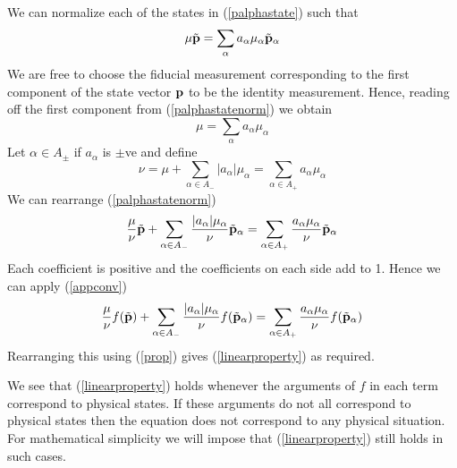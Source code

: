 \documentclass[10pt,twocolumn]{article}
\begin{document}
We can normalize each of the states in (\ref{palphastate}) such that
\begin{equation}\label{palphastatenorm}
\mu\tilde{\bf p}=\sum_\alpha a_\alpha\mu_\alpha \tilde{\bf p}_\alpha
\end{equation}
We are free to choose the fiducial measurement corresponding to the first
component of the state vector ${\bf p}$ to be the identity measurement.
Hence, reading off the first component from (\ref{palphastatenorm}) we
obtain
\begin{equation}
\mu= \sum_\alpha a_\alpha\mu_\alpha
\end{equation}
Let $\alpha\in A_{\pm}$ if $a_\alpha$ is $\pm$ve and define
\begin{equation}
\nu=\mu+\sum_{\alpha\in A_-} |a_\alpha|\mu_\alpha
=\sum_{\alpha\in A_+} a_\alpha \mu_\alpha
\end{equation}
We can rearrange (\ref{palphastatenorm})
\begin{equation}
{\mu\over\nu} \tilde{\bf p} + \sum_{\alpha\in A_-} {|a_\alpha
|\mu_\alpha \over \nu}\tilde{\bf p}_\alpha
=\sum_{\alpha\in A_+} {a_\alpha \mu_\alpha \over \nu}\tilde{\bf p}_\alpha
\end{equation}
Each coefficient is positive and the coefficients on each side add to
1. Hence we can apply (\ref{appconv})
\begin{equation}
{\mu\over\nu} f(\tilde{\bf p}) + \sum_{\alpha\in A_-} {|a_\alpha
|\mu_\alpha \over \nu}f(\tilde{\bf p}_\alpha)
=\sum_{\alpha\in A_+} {a_\alpha \mu_\alpha \over \nu}f(\tilde{\bf
p}_\alpha)
\end{equation}
Rearranging this using (\ref{prop}) gives (\ref{linearproperty}) as required.

We see that (\ref{linearproperty}) holds whenever the
arguments of $f$ in each term correspond to physical states.  If these
arguments do not all correspond to physical states then the equation does
not correspond to any physical situation. For mathematical simplicity we
will impose that (\ref{linearproperty}) still holds in such cases.

\vspace{6mm}


\vspace{6mm}
\end{document}
